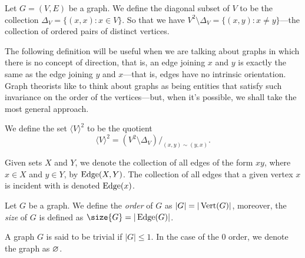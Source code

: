 \begin{definition}
    Let \(G = (V, E)\) be a graph. We define the diagonal subset of \(V\) to be
    the collection \(\Delta_V = \{(x, x) \colon x \in V\}\). So that we have
    \(V^2 \setminus \Delta_V = \{(x, y) \colon x \neq y\}\)---the collection of
    ordered pairs of distinct vertices.
\end{definition}

The following definition will be useful when we are talking about graphs in
which there is no concept of direction, that is, an edge joining \(x\) and \(y\)
is exactly the same as the edge joining \(y\) and \(x\)---that is, edges have
no intrinsic orientation. Graph theorists like to think about graphs as being
entities that satisfy such invariance on the order of the vertices---but, when
it's possible, we shall take the most general approach.

\begin{definition}
    We define the set \(\langle V \rangle^2\) to be the quotient
    \[
        \langle V \rangle^2 = (V^2 \setminus \Delta_V)/_{(x, y) \sim (y, x)}.
    \]
\end{definition}

\begin{notation}
    Given sets \(X\) and \(Y\), we denote the collection of all edges of the form
    \(xy\), where \(x \in X\) and \(y \in Y\), by \(\operatorname{Edge}(X, Y)\). The collection of
    all edges that a given vertex \(x\) is incident with is denoted \(\operatorname{Edge}(x)\).
\end{notation}

\begin{definition}\label{def:graph-order-size}
    Let \(G\) be a graph. We define the \emph{order} of \(G\) as
    \(|G| =|\operatorname{Vert}(G)|\), moreover, the \emph{size} of \(G\) is defined as
    \(\size{G} = |\Edge(G)|\).
\end{definition}

\begin{definition}
    A graph \(G\) is said to be trivial if \(|G| \leq 1\). In the case of the
    \(0\) order, we denote the graph as \(\varnothing\).
\end{definition}
